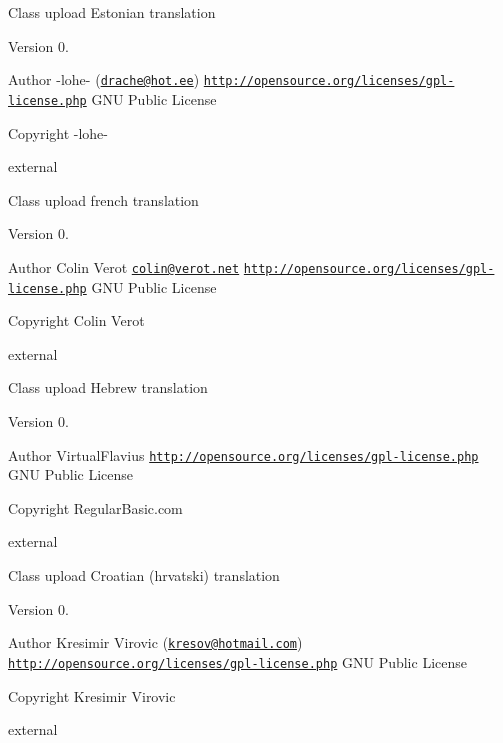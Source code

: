 Class upload Estonian translation

\begin{DoxyVersion}{Version}
0. 
\end{DoxyVersion}
\begin{DoxyAuthor}{Author}
-\/lohe-\/ (\href{mailto:drache@hot.ee}{\tt drache@hot.\+ee})  \href{http://opensource.org/licenses/gpl-license.php}{\tt http\+://opensource.\+org/licenses/gpl-\/license.\+php} G\+N\+U Public License 
\end{DoxyAuthor}
\begin{DoxyCopyright}{Copyright}
-\/lohe-\/
\end{DoxyCopyright}
external

Class upload french translation

\begin{DoxyVersion}{Version}
0. 
\end{DoxyVersion}
\begin{DoxyAuthor}{Author}
Colin Verot \href{mailto:colin@verot.net}{\tt colin@verot.\+net}  \href{http://opensource.org/licenses/gpl-license.php}{\tt http\+://opensource.\+org/licenses/gpl-\/license.\+php} G\+N\+U Public License 
\end{DoxyAuthor}
\begin{DoxyCopyright}{Copyright}
Colin Verot
\end{DoxyCopyright}
external

Class upload Hebrew translation

\begin{DoxyVersion}{Version}
0. 
\end{DoxyVersion}
\begin{DoxyAuthor}{Author}
Virtual\+Flavius  \href{http://opensource.org/licenses/gpl-license.php}{\tt http\+://opensource.\+org/licenses/gpl-\/license.\+php} G\+N\+U Public License 
\end{DoxyAuthor}
\begin{DoxyCopyright}{Copyright}
Regular\+Basic.\+com
\end{DoxyCopyright}
external

Class upload Croatian (hrvatski) translation

\begin{DoxyVersion}{Version}
0. 
\end{DoxyVersion}
\begin{DoxyAuthor}{Author}
Kresimir Virovic (\href{mailto:kresov@hotmail.com}{\tt kresov@hotmail.\+com})  \href{http://opensource.org/licenses/gpl-license.php}{\tt http\+://opensource.\+org/licenses/gpl-\/license.\+php} G\+N\+U Public License 
\end{DoxyAuthor}
\begin{DoxyCopyright}{Copyright}
Kresimir Virovic
\end{DoxyCopyright}
external

